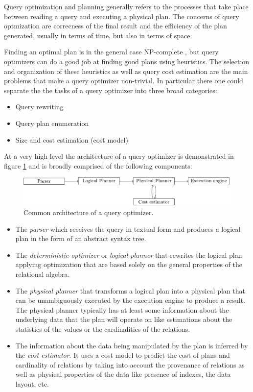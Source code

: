 Query optimization and planning generally refers to the processes that
take place between reading a query and executing a physical plan. The
concerns of query optmization are correcness of the final result and
the efficiency of the plan generated, usually in terms of time, but
also in terms of space.

Finding an optimal plan is in the general case NP-complete
\cite{ullmanInformationIntegrationUsing1997}, but query optimizers can
do a good job at finding good plans using heuristics. The selection
and organization of these heuristics as well as query cost estimation
are the main problems that make a query optimizer non-trivial. In
particular there one could separate the the tasks of a query optimizer
into three broad categories:

\begin{itemize}
\item Query rewriting
\item Query plan enumeration
\item Size and cost estimation (cost model)
\end{itemize}

At a very high level the architecture of a query optimizer is
demonstrated in figure \ref{fig:optimizer_arch} and is broadly
comprised of the following components:

\begin{figure}[p]
\centering
\includegraphics[width=\textwidth]{./imgs/optimizer_architecture.pdf}
\caption{\label{fig:optimizer_arch}Common architecture of a query
  optimizer.}
\end{figure}

\begin{itemize}
\item The \emph{parser} which receives the query in textual form and
  produces a logical plan in the form of an abstract syntax tree.
\item The \emph{deterministic optimizer} or \emph{logical planner}
  that rewrites the logical plan applying optimization that are based
  solely on the general properties of the relational algebra.
\item The \emph{physical planner} that transforms a logical plan into
  a physical plan that can be unambiguously executed by the execution
  engine to produce a result. The physical planner typically has at
  least some information about the underlying data that the plan will
  operate on like estimations about the statistics of the values or
  the cardinalities of the relations.
\item The information about the data being manipulated by the plan is
  inferred by the \emph{cost estimator}. It uses a cost model to
  predict the cost of plans and cardinality of relations by taking
  into account the provenance of relations as well as physical
  properties of the data like presence of indexes, the data layout,
  etc.
\end{itemize}

